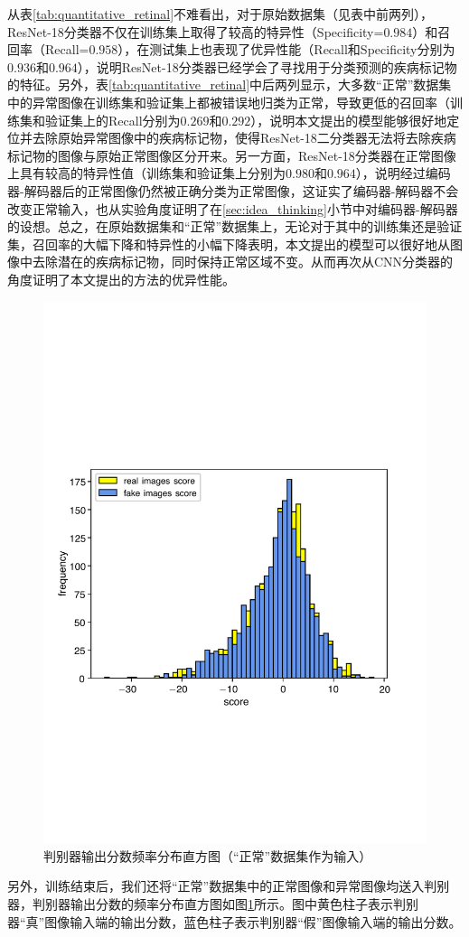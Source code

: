 从表\ref{tab:quantitative_retinal}不难看出，对于原始数据集（见表中前两列），ResNet-18分类器不仅在训练集上取得了较高的特异性（Specificity=$0.984$）和召回率（Recall=$0.958$），在测试集上也表现了优异性能（Recall和Specificity分别为$0.936$和$0.964$），说明ResNet-18分类器已经学会了寻找用于分类预测的疾病标记物的特征。另外，表\ref{tab:quantitative_retinal}中后两列显示，大多数“正常”数据集中的异常图像在训练集和验证集上都被错误地归类为正常，导致更低的召回率（训练集和验证集上的Recall分别为$0.269$和$0.292$），说明本文提出的模型能够很好地定位并去除原始异常图像中的疾病标记物，使得ResNet-18二分类器无法将去除疾病标记物的图像与原始正常图像区分开来。另一方面，ResNet-18分类器在正常图像上具有较高的特异性值（训练集和验证集上分别为$0.980$和$0.964$），说明经过编码器-解码器后的正常图像仍然被正确分类为正常图像，这证实了编码器-解码器不会改变正常输入，也从实验角度证明了在\ref{sec:idea_thinking}小节中对编码器-解码器的设想。总之，在原始数据集和“正常”数据集上，无论对于其中的训练集还是验证集，召回率的大幅下降和特异性的小幅下降表明，本文提出的模型可以很好地从图像中去除潜在的疾病标记物，同时保持正常区域不变。从而再次从CNN分类器的角度证明了本文提出的方法的优异性能。
\begin{figure}[h]
	\centering
	\includegraphics[width=1.0\textwidth]{figure/score_distribution}
	\caption{判别器输出分数频率分布直方图（“正常”数据集作为输入）}
	\label{fig:hist_freq}
\end{figure}
另外，训练结束后，我们还将“正常”数据集中的正常图像和异常图像均送入判别器，判别器输出分数的频率分布直方图如图\ref{fig:hist_freq}所示。图中黄色柱子表示判别器“真”图像输入端的输出分数，蓝色柱子表示判别器“假”图像输入端的输出分数。

